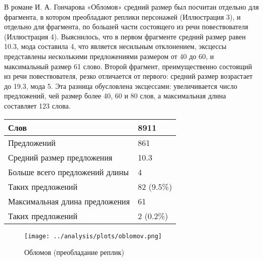 \documentclass{kursa4}
\begin{document}
{{        В романе И. А. Гончарова «Обломов» средний размер
        был посчитан отдельно для фрагмента, в котором преобладают реплики
        персонажей (Иллюстрация 3), и отдельно для фрагмента, по большей части
        состоящего из речи повествователя (Иллюстрация 4). Выяснилось, что в
        первом фрагменте средний размер равен 10.3, мода составила 4, что
        является несильным отклонением, эксцессы представлены несколькими
        предложениями размером от 40 до 60, и максимальный размер 61 слово.
        Второй фрагмент, преимущественно состоящий из речи повествователя,
        резко отличается от первого: средний размер возрастает до 19.3, мода 5.
        Эта разница обусловлена эксцессами: увеличивается
        число предложений, чей размер более 40, 60 и 80 слов, а максимальная
        длина составляет 123 слова. 

        \begin{center}
          \tablehead{}
          \begin{tabular}{|m{5.7730002cm}|m{1.6559999cm}|}
            \hline
            Слов &
            8911\\\hline
            Предложений &
            861\\\hline
            Средний размер предложения &
            10.3\\\hline
            Больше всего предложений длины &
            4\\\hline
            Таких предложений &
            82 (9.5\%)\\\hline
            Максимальная длина предложения &
            61\\\hline
            Таких предложений &
            2 (0.2\%)\\\hline
          \end{tabular}
        \end{center}
        
        \begin{figure}[htbp]
          \centering
          \texttt{[image: ../analysis/plots/oblomov.png]}
          \caption{Обломов (преобладание реплик)}
        \end{figure}


}}
\end{document}
